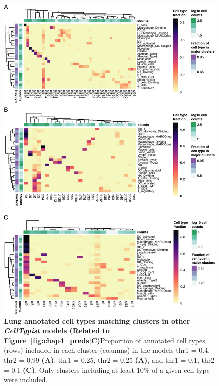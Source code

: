 \begin{figure}[ht!] 
\centering
\includegraphics[scale=0.84]{Appendix2/Figs/appB_otherCtFrac_lung.png} %
\caption[Lung annotated cell types matching clusters in other \textit{CellTypist} models]{\textbf{Lung annotated cell types matching clusters in other \textit{CellTypist} models (Related to Figure~\ref{fig:chap4_preds}C)}\newline Proportion of annotated cell types (rows) included in each cluster (columns) in the models thr1 = 0.4, thr2 = 0.99 \textbf{(A)}, thr1 = 0.25, thr2 = 0.25 \textbf{(A)}, and thr1 = 0.1, thr2 = 0.1 \textbf{(C)}. Only clusters including at least 10\% of a given cell type were included.}
\label{fig:appB_otherct}
\end{figure}


